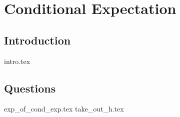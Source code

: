 \documentclass{exam}
\begin{document}
\section{Conditional Expectation}
\subsection{Introduction}
{intro.tex}
\subsection{Questions}
\begin{questions}
{exp_of_cond_exp.tex}
{take_out_h.tex}
\end{questions}

\end{document}
